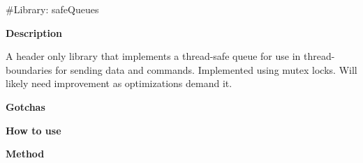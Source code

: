 \#\+Library\+: safe\+Queues

{\bfseries{Description}}

A header only library that implements a thread-\/safe queue for use in thread-\/boundaries for sending data and commands. Implemented using mutex locks. Will likely need improvement as optimizations demand it.

{\bfseries{Gotchas}}

{\bfseries{How to use}}

{\bfseries{Method}} 